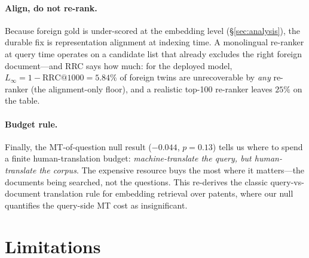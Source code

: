 \documentclass[11pt]{article}
\begin{document}
\paragraph{Align, do not re-rank.}
Because foreign gold is under-scored at the embedding level
(\S\ref{sec:analysis}), the durable fix is representation alignment at indexing
time. A monolingual re-ranker at query time operates on a candidate list that
already excludes the right foreign document---and RRC says how much: for the
deployed model, $L_\infty = 1-\mathrm{RRC@1000}=5.84\%$ of foreign twins are
unrecoverable by \emph{any} re-ranker (the alignment-only floor), and a realistic
top-100 re-ranker leaves $25\%$ on the table.

\paragraph{Budget rule.}
Finally, the MT-of-question null result ($-0.044$, $p=0.13$) tells us where to
spend a finite human-translation budget: \emph{machine-translate the query, but
human-translate the corpus}. The expensive resource buys the most where it
matters---the documents being searched, not the questions. This re-derives the
classic query-vs-document translation rule \citep{oard1998,salehpecina2020} for
embedding retrieval over patents, where our null quantifies the query-side MT
cost as insignificant.

\section*{Limitations}
\end{document}
